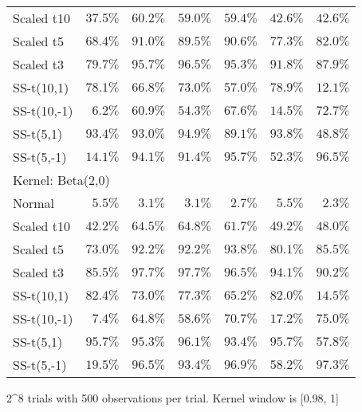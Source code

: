 \begin{longtable}{lrrrrrr}
Scaled t10 & $37.5\%$ & $60.2\%$ & $59.0\%$ & $59.4\%$ & $42.6\%$ & $42.6\%$ \\ 
Scaled t5 & $68.4\%$ & $91.0\%$ & $89.5\%$ & $90.6\%$ & $77.3\%$ & $82.0\%$ \\ 
Scaled t3 & $79.7\%$ & $95.7\%$ & $96.5\%$ & $95.3\%$ & $91.8\%$ & $87.9\%$ \\ 
SS-t(10,1) & $78.1\%$ & $66.8\%$ & $73.0\%$ & $57.0\%$ & $78.9\%$ & $12.1\%$ \\ 
SS-t(10,-1) & $6.2\%$ & $60.9\%$ & $54.3\%$ & $67.6\%$ & $14.5\%$ & $72.7\%$ \\ 
SS-t(5,1) & $93.4\%$ & $93.0\%$ & $94.9\%$ & $89.1\%$ & $93.8\%$ & $48.8\%$ \\ 
SS-t(5,-1) & $14.1\%$ & $94.1\%$ & $91.4\%$ & $95.7\%$ & $52.3\%$ & $96.5\%$ \\ 
\midrule
\multicolumn{7}{l}{Kernel: Beta(2,0)} \\ 
\midrule
Normal & $5.5\%$ & $3.1\%$ & $3.1\%$ & $2.7\%$ & $5.5\%$ & $2.3\%$ \\ 
Scaled t10 & $42.2\%$ & $64.5\%$ & $64.8\%$ & $61.7\%$ & $49.2\%$ & $48.0\%$ \\ 
Scaled t5 & $73.0\%$ & $92.2\%$ & $92.2\%$ & $93.8\%$ & $80.1\%$ & $85.5\%$ \\ 
Scaled t3 & $85.5\%$ & $97.7\%$ & $97.7\%$ & $96.5\%$ & $94.1\%$ & $90.2\%$ \\ 
SS-t(10,1) & $82.4\%$ & $73.0\%$ & $77.3\%$ & $65.2\%$ & $82.0\%$ & $14.5\%$ \\ 
SS-t(10,-1) & $7.4\%$ & $64.8\%$ & $58.6\%$ & $70.7\%$ & $17.2\%$ & $75.0\%$ \\ 
SS-t(5,1) & $95.7\%$ & $95.3\%$ & $96.1\%$ & $93.4\%$ & $95.7\%$ & $57.8\%$ \\ 
SS-t(5,-1) & $19.5\%$ & $96.5\%$ & $93.4\%$ & $96.9\%$ & $58.2\%$ & $97.3\%$ \\ 
\bottomrule
\end{longtable}
\begin{minipage}{\linewidth}
2\textasciicircum{}8 trials with 500 observations per trial. Kernel window is [0.98, 1]\\
\end{minipage}

